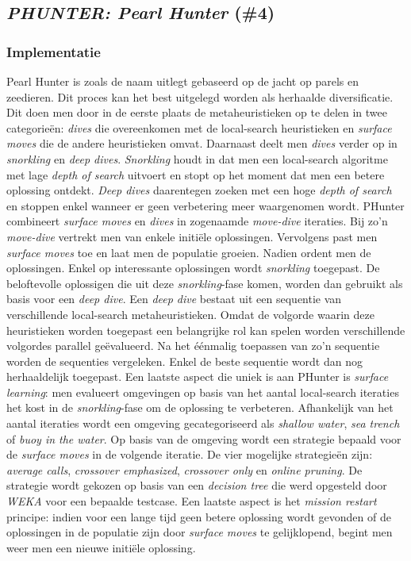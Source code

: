 \subsection{\emph{PHUNTER: Pearl Hunter} (\#4)}
\label{sss:phunter}
\subsubsection{Implementatie}
Pearl Hunter\cite{chesc-phunter} is zoals de naam uitlegt gebaseerd op de jacht op parels en zeedieren. Dit proces kan het best uitgelegd worden als herhaalde diversificatie. Dit doen men door in de eerste plaats de metaheuristieken op te delen in twee categorie\"en: \emph{dives} die overeenkomen met de local-search heuristieken en \emph{surface moves} die de andere heuristieken omvat. Daarnaast deelt men \emph{dives} verder op in \emph{snorkling} en \emph{deep dives}. \emph{Snorkling} houdt in dat men een local-search algoritme met lage \emph{depth of search} uitvoert en stopt op het moment dat men een betere oplossing ontdekt. \emph{Deep dives} daarentegen zoeken met een hoge \emph{depth of search} en stoppen enkel wanneer er geen verbetering meer waargenomen wordt. PHunter combineert \emph{surface moves} en \emph{dives} in zogenaamde \emph{move-dive} iteraties. Bij zo'n \emph{move-dive} vertrekt men van enkele initi\"ele oplossingen. Vervolgens past men \emph{surface moves} toe en 
laat men de populatie groeien. Nadien ordent men de oplossingen. Enkel op interessante oplossingen wordt \emph{snorkling} toegepast. De beloftevolle oplossigen die uit deze \emph{snorkling}-fase komen, worden dan gebruikt als basis voor een \emph{deep dive}. Een \emph{deep dive} bestaat uit een sequentie van verschillende local-search metaheuristieken. Omdat de volgorde waarin deze heuristieken worden toegepast een belangrijke rol kan spelen worden verschillende volgordes parallel ge\"evalueerd. Na het \'e\'enmalig toepassen van zo'n sequentie worden de sequenties vergeleken. Enkel de beste sequentie wordt dan nog herhaaldelijk toegepast. Een laatste aspect die uniek is aan PHunter is \emph{surface learning}: men evalueert omgevingen op basis van het aantal local-search iteraties het kost in de \emph{snorkling}-fase om de oplossing te verbeteren. Afhankelijk van het aantal iteraties wordt een omgeving gecategoriseerd als \emph{shallow water}, \emph{sea trench} of \emph{buoy in the water}. Op basis van de 
omgeving wordt een strategie bepaald voor de \emph{surface moves} in de volgende iteratie. De vier mogelijke strategie\"en zijn: \emph{average calls}, \emph{crossover emphasized}, \emph{crossover only} en \emph{online pruning}. De strategie wordt gekozen op basis van een \emph{decision tree} die werd opgesteld door \emph{WEKA} voor een bepaalde testcase. Een laatste aspect is het \emph{mission restart} principe: indien voor een lange tijd geen betere oplossing wordt gevonden of de oplossingen in de populatie zijn door \emph{surface moves} te gelijklopend, begint men weer men een nieuwe initi\"ele oplossing.
